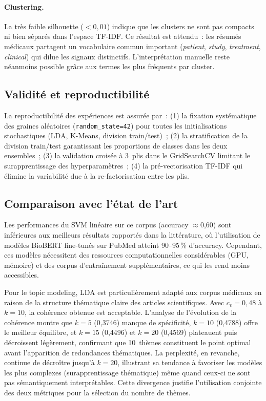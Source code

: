 \documentclass[11pt, a4paper, oneside]{article}
\begin{document}
\paragraph{Clustering.} La très faible silhouette ($<0,01$) indique que les clusters ne sont pas compacts ni bien séparés dans l'espace TF-IDF. Ce résultat est attendu~: les résumés médicaux partagent un vocabulaire commun important (\emph{patient}, \emph{study}, \emph{treatment}, \emph{clinical}) qui dilue les signaux distinctifs. L'interprétation manuelle reste néanmoins possible grâce aux termes les plus fréquents par cluster.

\subsection{Validité et reproductibilité}

La reproductibilité des expériences est assurée par~: (1) la fixation systématique des graines aléatoires (\texttt{random\_state=42}) pour toutes les initialisations stochastiques (LDA, K-Means, division train/test)~; (2) la stratification de la division train/test garantissant les proportions de classes dans les deux ensembles~; (3) la validation croisée à 3~plis dans le GridSearchCV limitant le surapprentissage des hyperparamètres~; (4) la pré-vectorisation TF-IDF qui élimine la variabilité due à la re-factorisation entre les plis.

\subsection{Comparaison avec l'état de l'art}

Les performances du SVM linéaire sur ce corpus (accuracy $\approx$0,60) sont inférieures aux meilleurs résultats rapportés dans la littérature, où l'utilisation de modèles BioBERT fine-tunés sur PubMed atteint 90--95\,\% d'accuracy. Cependant, ces modèles nécessitent des ressources computationnelles considérables (GPU, mémoire) et des corpus d'entraînement supplémentaires, ce qui les rend moins accessibles.

Pour le topic modeling, LDA est particulièrement adapté aux corpus médicaux en raison de la structure thématique claire des articles scientifiques. Avec $c_v = 0,48$ à $k=10$, la cohérence obtenue est acceptable. L'analyse de l'évolution de la cohérence montre que $k=5$ (0,3746) manque de spécificité, $k=10$ (0,4788) offre le meilleur équilibre, et $k=15$ (0,4496) et $k=20$ (0,4569) plateauent puis décroissent légèrement, confirmant que 10~thèmes constituent le point optimal avant l'apparition de redondances thématiques. La perplexité, en revanche, continue de décroître jusqu'à $k=20$, illustrant sa tendance à favoriser les modèles les plus complexes (surapprentissage thématique) même quand ceux-ci ne sont pas sémantiquement interprétables. Cette divergence justifie l'utilisation conjointe des deux métriques pour la sélection du nombre de thèmes.
\end{document}
